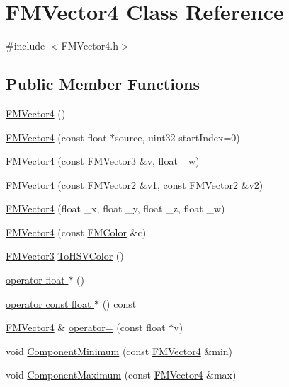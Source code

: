 \hypertarget{classFMVector4}{
\section{FMVector4 Class Reference}
\label{classFMVector4}
}


{\ttfamily \#include $<$FMVector4.h$>$}

\subsection*{Public Member Functions}
\begin{DoxyCompactItemize}
\item 
\hyperlink{classFMVector4_a3b2cd748408a7afe130fa45c5bec65e4}{FMVector4} ()
\item 
\hyperlink{classFMVector4_ae8df6ed6fd4394719143750b94067465}{FMVector4} (const float $\ast$source, uint32 startIndex=0)
\item 
\hyperlink{classFMVector4_a0a4eae4929c2faa00791d5da8a1da820}{FMVector4} (const \hyperlink{classFMVector3}{FMVector3} \&v, float \_\-w)
\item 
\hyperlink{classFMVector4_a43e96d0020a66a24693f5590763629cd}{FMVector4} (const \hyperlink{classFMVector2}{FMVector2} \&v1, const \hyperlink{classFMVector2}{FMVector2} \&v2)
\item 
\hyperlink{classFMVector4_a731d6b58dc88125ecc21ef20111ebc19}{FMVector4} (float \_\-x, float \_\-y, float \_\-z, float \_\-w)
\item 
\hyperlink{classFMVector4_a9b4b895524a7d4b84491e1e7dd3dbabb}{FMVector4} (const \hyperlink{classFMColor}{FMColor} \&c)
\item 
\hyperlink{classFMVector3}{FMVector3} \hyperlink{classFMVector4_adbcdbe2324e6125a89cde808c0c51602}{ToHSVColor} ()
\item 
\hyperlink{classFMVector4_ac6f44432afa499a84c2c201de76749a6}{operator float $\ast$} ()
\item 
\hyperlink{classFMVector4_a756aff49407ca315e21591402fdc66fd}{operator const float $\ast$} () const 
\item 
\hyperlink{classFMVector4}{FMVector4} \& \hyperlink{classFMVector4_a1bd226d14764ca0a5e1332ca3d09b73e}{operator=} (const float $\ast$v)
\item 
void \hyperlink{classFMVector4_a341f5e0855c03994ac4c562252d6ee8b}{ComponentMinimum} (const \hyperlink{classFMVector4}{FMVector4} \&min)
\item 
void \hyperlink{classFMVector4_ae43fd5501fb7beaf8e8664e92c7e2861}{ComponentMaximum} (const \hyperlink{classFMVector4}{FMVector4} \&max)
\end{DoxyCompactItemize}
